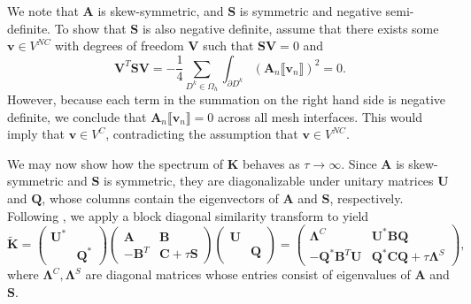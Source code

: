 \documentclass[preprint,10pt]{elsarticle}
\newcommand{\LRp}[1]{\left( #1 \right)}
\newcommand{\LRa}[1]{\left\langle #1 \right\rangle}
\newcommand{\jump}[1] {\ensuremath{\llbracket#1\rrbracket}}
\newcommand{\Gh}{\Gamma_h}
\newcommand{\Oh}{\Omega_h}
\newcommand{\note}[1]{{\color{blue}#1}}
\begin{document}
\note{We note that $\bm{A}$ is skew-symmetric, and $\bm{S}$ is symmetric and negative semi-definite.  To show that $\bm{S}$ is also negative definite, assume that there exists some $\bm{v} \in V^{NC}$ with degrees of freedom $\bm{V}$ such that $\bm{S}\bm{V} = 0$ and
\[
\bm{V}^T\bm{S}\bm{V} = -\frac{1}{4}\sum_{D^k \in \Oh} \int_{\partial D^k} \LRp{\bm{A}_n\jump{ \bm{v}_n}}^2 = 0.
\]
However, because each term in the summation on the right hand side is negative definite, we conclude that $\bm{A}_n\jump{ \bm{v}_n} = 0$ across all mesh interfaces.  This would imply that $\bm{v}\in V^C$, contradicting the assumption that $\bm{v} \in V^{NC}$.}  %

We may now show how the \note{spectrum} of $\bm{K}$ behaves as $\tau \rightarrow \infty$.  Since $\bm{A}$ is skew-symmetric and $\bm{S}$ is symmetric, they are diagonalizable under unitary matrices $\bm{U}$ and $\bm{Q}$, whose columns contain the eigenvectors of $\bm{A}$ and $\bm{S}$, respectively.   
Following \cite{Warburton20063205}, we apply a block diagonal similarity transform to yield
\[
\tilde{\bm{K}} = \left(\begin{array}{cc}
\bm{U}^* & \\
& \bm{Q}^*
\end{array}\right)
\left(\begin{array}{cc}
\bm{A} & \bm{B}\\
-\bm{B}^T & \bm{C} + \tau \bm{S}
\end{array}\right)
\left(\begin{array}{cc}
\bm{U} & \\
& \bm{Q}
\end{array}\right)
 = \left(\begin{array}{cc}
\bm{\Lambda}^C & \bm{U}^*\bm{B}\bm{Q}\\
-\bm{Q}^*\bm{B}^T\bm{U} & \bm{Q}^*\bm{C}\bm{Q} + \tau \bm{\Lambda}^{S}
\end{array}\right),
\]
where $\bm{\Lambda}^C,\bm{\Lambda}^{S}$ are diagonal matrices whose entries consist of eigenvalues of $\bm{A}$ and $\bm{S}$.  
\end{document}

